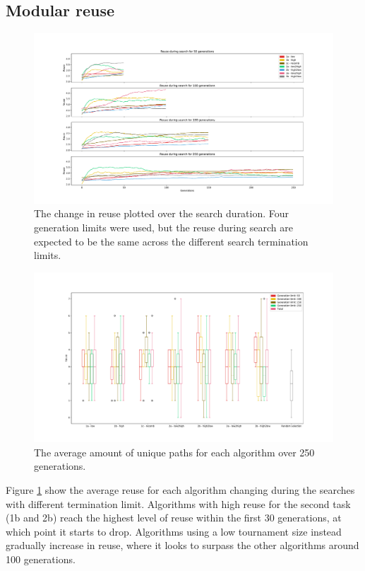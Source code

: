 \subsection{Modular reuse}
\begin{figure}
    \includegraphics[width=1.2\textwidth, center]{Chapters/4.Experiments/exp3/figures/reuse_progression.pdf}
    \caption[Module reuse during search]{The change in reuse plotted over the search duration. Four generation limits were used, but the reuse during search are expected to be the same across the different search termination limits.}
    \label{fig:exp3.reuseprogression}
\end{figure}
\begin{figure}[ht]
    \includegraphics[width=1.25\textwidth, center]{Chapters/4.Experiments/exp3/figures/reuse_boxplot.pdf}
    \caption[Module reuse boxplot]{The average amount of unique paths for each algorithm over 250 generations.}
    \label{fig:exp3.reuseboxplot}
\end{figure}

Figure \ref{fig:exp3.reuseprogression} show the average reuse for each algorithm changing during the searches with different termination limit. Algorithms with high reuse for the second task (1b and 2b) reach the highest level of reuse within the first 30 generations, at which point it starts to drop. Algorithms using a low tournament size instead gradually increase in reuse, where it looks to surpass the other algorithms around 100 generations.  


